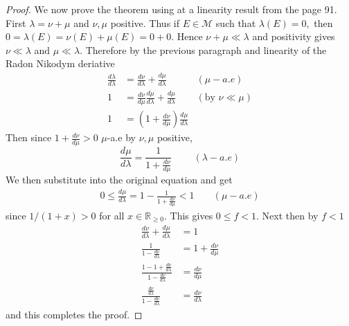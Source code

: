 \documentclass[11pt]{amsart}
\theoremstyle{definition}
\numberwithin{theorem}{section}
\numberwithin{definition}{section}
\numberwithin{equation}{section}
\def\scriptm{{\mathcal M}}
\begin{document}
\begin{proof}
	We now prove the theorem using at a linearity result from the page 91. First $\lambda = \nu + \mu$ and $\nu, \mu$
	positive. Thus if $E \in \scriptm$ such that $\lambda(E) = 0,$ then $0 = \lambda(E) = \nu(E) + \mu(E) = 0 + 0$.
	Hence $\nu + \mu \ll \lambda $ and positivity gives $\nu \ll \lambda$ and $\mu \ll \lambda$. Therefore by the previous paragraph and linearity of the Radon Nikodym deriative
	\begin{equation*}
		\begin{aligned}
			\frac{d \lambda}{d\lambda} &= \frac{d \nu}{d\lambda} + \frac{d \mu}{d \lambda} & (\mu-a.e) \\
			1 &= 	\frac{d \nu}{d\mu}\frac{d \mu}{d \lambda} + \frac{d \mu}{d \lambda} & (\text{by } \nu \ll \mu) \\
			1 &= \left(1 + \frac{d \nu}{d \mu}\right) \frac{d\mu}{d\lambda}
		\end{aligned}
	\end{equation*}
	Then since $1 + \frac{d\nu}{d\mu} > 0$ $\mu$-a.e by $\nu, \mu$ positive,
	\begin{equation*}
		\frac{d\mu}{d\lambda} = \frac{1}{1 + \frac{d\nu}{d\mu} }\;\;\;\;\;\;\;\; (\lambda-a.e)
	\end{equation*}
	We then substitute into the original equation and get
	\begin{equation*}
		\begin{aligned}
			0 \leq \frac{d\mu}{d\lambda} = 1- \frac{1}{1 + \frac{d\nu}{d\mu} } < 1 \;\;\;\;\;\;\; (\mu-a.e)
		\end{aligned}
	\end{equation*}
	since $1/(1+x) > 0$ for all $x \in \mathbb{R}_{\geq 0}.$ This gives $0 \leq f < 1.$ Next 
	then by $f < 1$
	\begin{equation*}
		\begin{aligned}
			\frac{d \nu}{d\lambda} + \frac{d \mu}{d \lambda} &=1 \\
			\frac{1}{1 - \frac{d\nu}{d \lambda}} &= 1 + \frac{d \nu}{d\mu}\\
			\frac{1 - 1 + \frac{d\nu}{d\lambda}}{1 -\frac{d\nu}{d\lambda}} &= \frac{d \nu}{d \mu}  \\
			\frac{\frac{d\nu}{d\lambda}}{1 -\frac{d\nu}{d\lambda}} &= \frac{d\nu}{d\lambda}
		\end{aligned}
	\end{equation*}
	and this completes the proof.


\end{proof}
\end{document}
